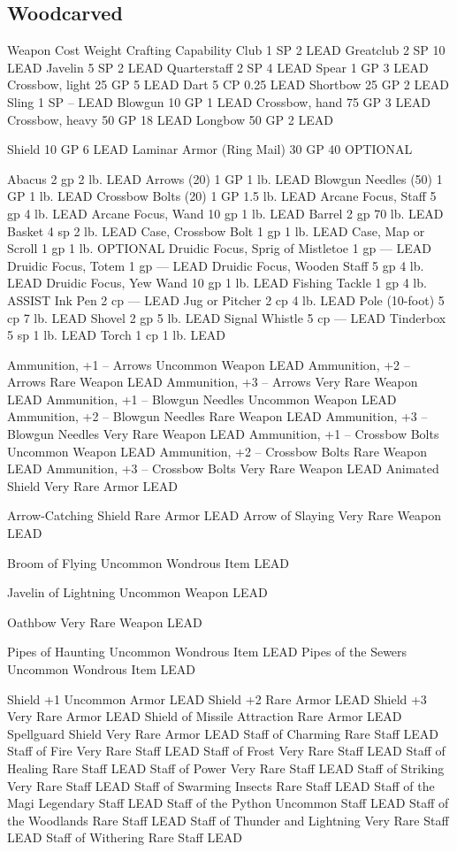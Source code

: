 \subsection*{Woodcarved} \label{ssec::woodcarved}
Weapon	Cost	Weight	Crafting Capability
Club	1 SP	2	LEAD
Greatclub	2 SP	10	LEAD
Javelin	5 SP	2	LEAD
Quarterstaff	2 SP	4	LEAD
Spear	1 GP	3	LEAD
Crossbow, light	25 GP	5	LEAD
Dart	5 CP	0.25	LEAD
Shortbow	25 GP	2	LEAD
Sling	1 SP	–	LEAD
Blowgun	10 GP	1	LEAD
Crossbow, hand	75 GP	3	LEAD
Crossbow, heavy	50 GP	18	LEAD
Longbow	50 GP	2	LEAD

Shield	10 GP	6	LEAD
Laminar Armor (Ring Mail)	30 GP	40	OPTIONAL

Abacus	2 gp	2 lb.	LEAD
Arrows (20)	1 GP	1 lb.	LEAD
Blowgun Needles (50)	1 GP	1 lb.	LEAD
Crossbow Bolts (20)	1 GP	1.5 lb.	LEAD
Arcane Focus, Staff	5 gp	4 lb.	LEAD
Arcane Focus, Wand	10 gp	1 lb.	LEAD
Barrel	2 gp	70 lb.	LEAD
Basket	4 sp	2 lb.	LEAD
Case, Crossbow Bolt	1 gp	1 lb.	LEAD
Case, Map or Scroll	1 gp	1 lb.	OPTIONAL
Druidic Focus, Sprig of Mistletoe	1 gp	—	LEAD
Druidic Focus, Totem	1 gp	—	LEAD
Druidic Focus, Wooden Staff	5 gp	4 lb.	LEAD
Druidic Focus, Yew Wand	10 gp	1 lb.	LEAD
Fishing Tackle	1 gp	4 lb.	ASSIST
Ink Pen	2 cp	—	LEAD
Jug or Pitcher	2 cp	4 lb.	LEAD
Pole (10-foot)	5 cp	7 lb.	LEAD
Shovel	2 gp	5 lb.	LEAD
Signal Whistle	5 cp	—	LEAD
Tinderbox	5 sp	1 lb.	LEAD
Torch	1 cp	1 lb.	LEAD

Ammunition, +1 – Arrows	Uncommon	Weapon	LEAD
Ammunition, +2 – Arrows	Rare	Weapon	LEAD
Ammunition, +3 – Arrows	Very Rare	Weapon	LEAD
Ammunition, +1 – Blowgun Needles	Uncommon	Weapon	LEAD
Ammunition, +2 – Blowgun Needles	Rare	Weapon	LEAD
Ammunition, +3 – Blowgun Needles	Very Rare	Weapon	LEAD
Ammunition, +1 – Crossbow Bolts	Uncommon	Weapon	LEAD
Ammunition, +2 – Crossbow Bolts	Rare	Weapon	LEAD
Ammunition, +3 – Crossbow Bolts	Very Rare	Weapon	LEAD
Animated Shield	Very Rare	Armor	LEAD

Arrow-Catching Shield	Rare	Armor	LEAD
Arrow of Slaying	Very Rare	Weapon	LEAD

Broom of Flying	Uncommon	Wondrous Item	LEAD

Javelin of Lightning	Uncommon	Weapon	LEAD

Oathbow	Very Rare	Weapon	LEAD

Pipes of Haunting	Uncommon	Wondrous Item	LEAD
Pipes of the Sewers	Uncommon	Wondrous Item	LEAD

Shield +1	Uncommon	Armor	LEAD
Shield +2	Rare	Armor	LEAD
Shield +3	Very Rare	Armor	LEAD
Shield of Missile Attraction	Rare	Armor	LEAD
Spellguard Shield	Very Rare	Armor	LEAD
Staff of Charming	Rare	Staff	LEAD
Staff of Fire	Very Rare	Staff	LEAD
Staff of Frost	Very Rare	Staff	LEAD
Staff of Healing	Rare	Staff	LEAD
Staff of Power	Very Rare	Staff	LEAD
Staff of Striking	Very Rare	Staff	LEAD
Staff of Swarming Insects	Rare	Staff	LEAD
Staff of the Magi	Legendary	Staff	LEAD
Staff of the Python	Uncommon	Staff	LEAD
Staff of the Woodlands	Rare	Staff	LEAD
Staff of Thunder and Lightning	Very Rare	Staff	LEAD
Staff of Withering	Rare	Staff	LEAD

